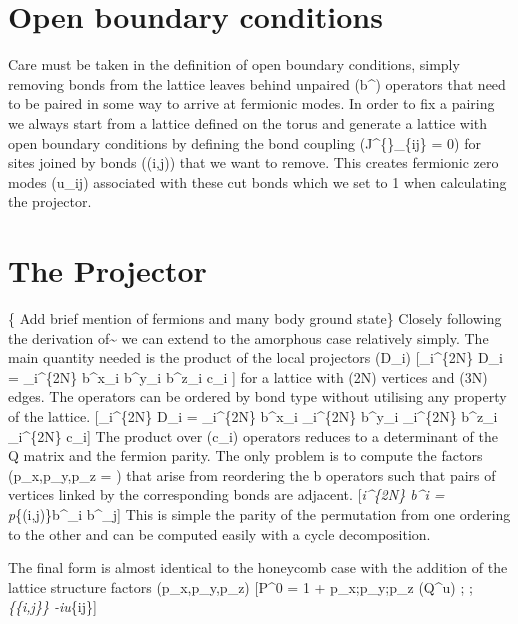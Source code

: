\section{Open boundary conditions}

Care must be taken in the definition of open boundary conditions, simply
removing bonds from the lattice leaves behind unpaired (b\^{}\alpha)
operators that need to be paired in some way to arrive at fermionic
modes. In order to fix a pairing we always start from a lattice defined
on the torus and generate a lattice with open boundary conditions by
defining the bond coupling (J\^{}\{\alpha\}\_\{ij\} = 0) for sites
joined by bonds ((i,j)) that we want to remove. This creates fermionic
zero modes (u\_ij) associated with these cut bonds which we set to 1
when calculating the projector.

\section{The Projector} \label{apx:projector}

\{\color{red} Add brief mention of fermions and many body ground state\}
Closely following the derivation
of\textasciitilde{}\cite{pedrocchiPhysicalSolutionsKitaev2011} we can
extend to the amorphous case relatively simply. The main quantity needed
is the product of the local projectors (D\_i) {[}\prod\_i\^{}\{2N\} D\_i
= \prod\_i\^{}\{2N\} b\^{}x\_i b\^{}y\_i b\^{}z\_i c\_i {]} for a
lattice with (2N) vertices and (3N) edges. The operators can be ordered
by bond type without utilising any property of the lattice.
{[}\prod\_i\^{}\{2N\} D\_i = \prod\_i\^{}\{2N\} b\^{}x\_i
\prod\_i\^{}\{2N\} b\^{}y\_i \prod\_i\^{}\{2N\} b\^{}z\_i
\prod\_i\^{}\{2N\} c\_i{]} The product over (c\_i) operators reduces to
a determinant of the Q matrix and the fermion parity. The only problem
is to compute the factors (p\_x,p\_y,p\_z = ) that arise from
reordering the b operators such that pairs of vertices linked by the
corresponding bonds are adjacent. {[}\prod\emph{i\^{}\{2N\}
b\^{}\alpha\emph{i = p}\alpha \prod}\{(i,j)\}b\^{}\alpha\_i
b\^{}\alpha\_j{]} This is simple the parity of the permutation from one
ordering to the other and can be computed easily with a cycle
decomposition.

The final form is almost identical to the honeycomb case with the
addition of the lattice structure factors (p\_x,p\_y,p\_z) {[}P\^{}0 = 1
+ p\_x;p\_y;p\_z (Q\^{}u) ; \hat{\pi} ;
\prod\emph{\{\{i,j\}\} -iu}\{ij\}{]}

